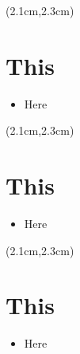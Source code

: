 \begin{preview}
\begin{textblock*}{5cm}(2.1cm,2.3cm) %
	{\color{red}{\large \textcircled{\small \themypage}}}
	\addtocounter{mypage}{1}
\end{textblock*}

\begin{minipage}{\textwidth}
	\setlength{\parskip}{0.4\baselineskip}

\section{This}

\begin{itemize}
	\item Here
\end{itemize}

\end{minipage}
\end{preview}

\begin{preview}
\begin{textblock*}{5cm}(2.1cm,2.3cm) %
{\color{red}{\large \textcircled{\small \themypage}}}
\addtocounter{mypage}{1}
\end{textblock*}

\begin{minipage}{\textwidth}
\setlength{\parskip}{0.4\baselineskip}

\section{This}

\begin{itemize}
	\item Here
\end{itemize}

\end{minipage}
\end{preview}

\begin{preview}
\begin{textblock*}{5cm}(2.1cm,2.3cm) %
	{\color{red}{\large \textcircled{\small \themypage}}}
	\addtocounter{mypage}{1}
\end{textblock*}

\begin{minipage}{\textwidth}
	\setlength{\parskip}{0.4\baselineskip}

\section{This}

\begin{itemize}
	\item Here
\end{itemize}

\end{minipage}
\end{preview}



